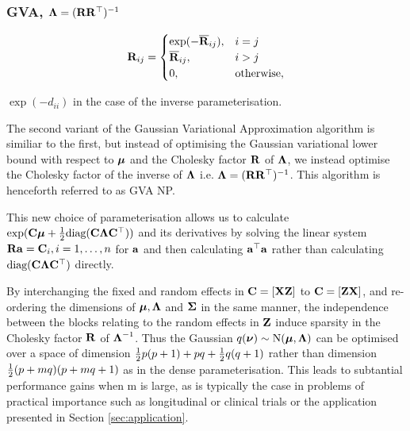 \documentclass{article}[12pt]
\newcommand{\mgc}[1]{{\color{blue}#1}}
\begin{document}
	\subsubsection{GVA, ${\boldsymbol \Lambda} = ({\bf R} {\bf R}^\top)^{-1}$}
	
	\begin{equation*}
		{\bf R}_{ij} =
		\begin{cases}
			\exp(-\overline{{\bf R}}_{ij}), & i = j             \\
			\overline{{\bf R}}_{ij},        & i > j             \\
			0,                          & \text{otherwise}, 
		\end{cases}
	\end{equation*}
	
	\mgc{$\exp{(-d_{ii})}$ in the case of the inverse parameterisation.}
	
	\noindent The second variant of the Gaussian Variational Approximation algorithm is similiar to the first, but
	instead of optimising the Gaussian variational lower bound with respect to ${\boldsymbol \mu}$ and the Cholesky factor
	${\bf R}$ of ${\boldsymbol \Lambda}$, we instead optimise the Cholesky factor of the inverse of ${\boldsymbol \Lambda}$ i.e. ${\boldsymbol \Lambda} =
	({\bf R} {\bf R}^\top)^{-1}$. This algorithm is henceforth referred to as GVA NP.
	
	\noindent This new choice of parameterisation allows us to calculate $\exp({\bf C} {\boldsymbol \mu} + \tfrac{1}{2} \text{diag}({\bf C}
	{\boldsymbol \Lambda} {\bf C}^\top))$ and its derivatives by solving the linear system ${\bf R} {\bf a} = {\bf C}_{i}, i=1, \ldots, n$ for
	${\bf a}$ and then calculating ${\bf a}^\top{\bf a}$ rather than calculating $\text{diag}({\bf C} {\boldsymbol \Lambda} {\bf C}^\top)$
	directly.
	
	\noindent By interchanging the fixed and random effects in ${\bf C} = [{\bf X} {\bf Z}]$ to ${\bf C} = [{\bf Z} {\bf X}]$, and re-
	ordering the dimensions of ${\boldsymbol \mu}, {\boldsymbol \Lambda}$ and ${\boldsymbol \Sigma}$ in the same manner, the independence between the
	blocks relating to the random effects in ${\bf Z}$ induce sparsity in the Cholesky factor ${\bf R}$ of
	${\boldsymbol \Lambda}^{-1}$. Thus the Gaussian $q({\boldsymbol \nu}) \sim \text{N}({\boldsymbol \mu}, {\boldsymbol \Lambda})$ can be optimised over a space of dimension
	$\tfrac{1}{2} p (p + 1) + pq + \tfrac{1}{2} q (q + 1)$ rather than dimension $\tfrac{1}{2} (p + mq) (p + mq + 1)$ as in the dense
	parameterisation. This leads to subtantial performance gains when m is large, as is typically the case in
	problems of practical importance such as longitudinal or clinical trials or the application presented in
	Section \ref{sec:application}.
	
\end{document}
